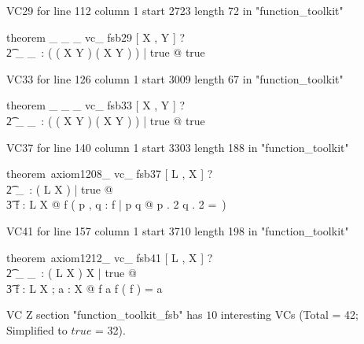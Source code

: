 \documentclass{article}
\begin{document}
VC29 for line 112 column 1 start 2723 length 72 in "function_toolkit"
\begin{zed}
theorem  \_  {\ffun} \_  \_ vc\_ fsb29 [ X , Y ] \vdash ? \\
   \t2 \exists \_ \ffun \_~: \power ( ( X \pfun Y ) \cap \finset ( X \cross Y ) ) | true @ true
\end{zed}

VC33 for line 126 column 1 start 3009 length 67 in "function_toolkit"
\begin{zed}
theorem  \_  {\finj} \_  \_ vc\_ fsb33 [ X , Y ] \vdash ? \\
   \t2 \exists \_ \finj \_~: \power ( ( X \ffun Y ) \cap ( X \pinj Y ) ) | true @ true
\end{zed}

VC37 for line 140 column 1 start 3303 length 188 in "function_toolkit"
\begin{zed}
theorem~axiom1208\_ vc\_ fsb37 [ L , X ] \vdash ? \\
   \t2 \exists \disjoint \_~: \power ( L \rel \power X ) | true @ \\
    \t3 \forall f : L \rel \power X @ \disjoint f \iff ( \forall p , q : f | p \neq q @ p . 2 \cap q . 2 =~\emptyset )
\end{zed}

VC41 for line 157 column 1 start 3710 length 198 in "function_toolkit"
\begin{zed}
theorem~axiom1212\_ vc\_ fsb41 [ L , X ] \vdash ? \\
   \t2 \exists \_ \partition \_~: ( L \rel \power X ) \rel \power X | true @ \\
    \t3 \forall f : L \rel \power X ; a : \power X @ f \partition a \iff \disjoint f \land \bigcup ( \ran f ) = a
\end{zed}



 VC Z section "function_toolkit_fsb" has $10$ interesting VCs (Total = 42; Simplified to $true$ = 32).



\end{document}
